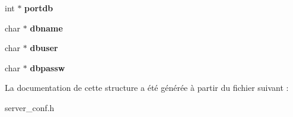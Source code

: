 \begin{DoxyCompactItemize}
\item 
\hypertarget{struct_server_options_a2d0838d497adbb90268461e9fb7011b5}{int $\ast$ {\bfseries portdb}}\label{struct_server_options_a2d0838d497adbb90268461e9fb7011b5}

\item 
\hypertarget{struct_server_options_aeb5780a92251203a659de23ac01f43f4}{char $\ast$ {\bfseries dbname}}\label{struct_server_options_aeb5780a92251203a659de23ac01f43f4}

\item 
\hypertarget{struct_server_options_afb39a000085218867ad6b0e6a027b374}{char $\ast$ {\bfseries dbuser}}\label{struct_server_options_afb39a000085218867ad6b0e6a027b374}

\item 
\hypertarget{struct_server_options_af9ffd0586c205c74ed2bd131e03e8b1c}{char $\ast$ {\bfseries dbpassw}}\label{struct_server_options_af9ffd0586c205c74ed2bd131e03e8b1c}

\end{DoxyCompactItemize}


La documentation de cette structure a été générée à partir du fichier suivant \-:\begin{DoxyCompactItemize}
\item 
server\-\_\-conf.\-h\end{DoxyCompactItemize}

